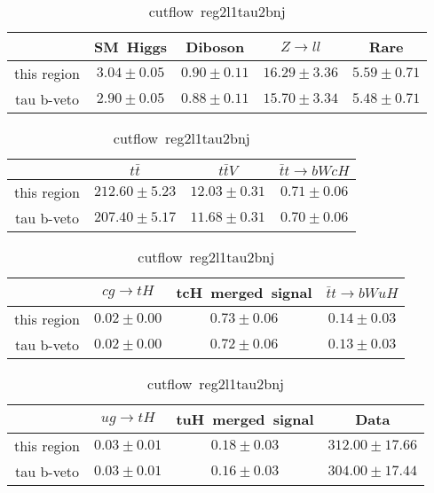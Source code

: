 \begin{table}
\caption{cutflow~reg2l1tau2bnj}
\centering
\begin{tabular}{|c|c|c|c|c|} \hline
 & SM~Higgs & Diboson & $Z\to ll$ & Rare\\\hline
this region & $3.04\pm0.05$ & $0.90\pm0.11$ & $16.29\pm3.36$ & $5.59\pm0.71$\\\hline
tau b-veto & $2.90\pm0.05$ & $0.88\pm0.11$ & $15.70\pm3.34$ & $5.48\pm0.71$\\\hline
\end{tabular}
\begin{tabular}{|c|c|c|c|} \hline
 & $t\bar{t}$ & $t\bar{t}V$ & $\bar{t}t\to bWcH$\\\hline
this region & $212.60\pm5.23$ & $12.03\pm0.31$ & $0.71\pm0.06$\\\hline
tau b-veto & $207.40\pm5.17$ & $11.68\pm0.31$ & $0.70\pm0.06$\\\hline
\end{tabular}
\begin{tabular}{|c|c|c|c|} \hline
 & $cg\to tH$ & tcH~merged~signal & $\bar{t}t\to bWuH$\\\hline
this region & $0.02\pm0.00$ & $0.73\pm0.06$ & $0.14\pm0.03$\\\hline
tau b-veto & $0.02\pm0.00$ & $0.72\pm0.06$ & $0.13\pm0.03$\\\hline
\end{tabular}
\begin{tabular}{|c|c|c|c|} \hline
 & $ug\to tH$ & tuH~merged~signal & Data\\\hline
this region & $0.03\pm0.01$ & $0.18\pm0.03$ & $312.00\pm17.66$\\\hline
tau b-veto & $0.03\pm0.01$ & $0.16\pm0.03$ & $304.00\pm17.44$\\\hline
\end{tabular}
\label{tab:cutflow_reg2l1tau2bnj}
\end{table}
